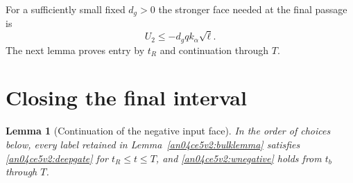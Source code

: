 \documentclass[11pt]{article}
\newtheorem{lemma}{Lemma}
\begin{document}
For a sufficiently small fixed $d_g>0$ the stronger face needed at the final passage is
\begin{equation}\label{an04ce5v2:deepgate}
 U_2\le -d_g q k_\alpha\sqrt\ell .
\end{equation}
The next lemma proves entry by $t_R$ and continuation through $T$.

\section{Closing the final interval}\label{an04ce5v2:centered}
\begin{lemma}[Continuation of the negative input face]\label{an04ce5v2:gatelemma}
In the order of choices below, every label retained in Lemma~\ref{an04ce5v2:bulklemma} satisfies \eqref{an04ce5v2:deepgate} for $t_R\le t\le T$, and \eqref{an04ce5v2:wnegative} holds from $t_b$ through $T$.
\end{lemma}
\end{document}
